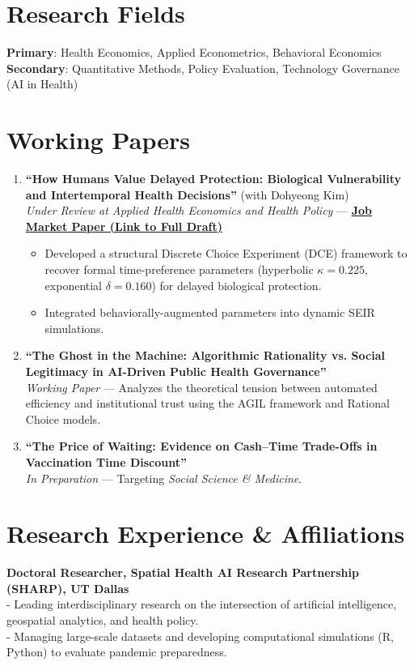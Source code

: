 \documentclass[11pt]{article}
\begin{document}
\section*{Research Fields}
\textbf{Primary}: Health Economics, Applied Econometrics, Behavioral Economics \\
\textbf{Secondary}: Quantitative Methods, Policy Evaluation, Technology Governance (AI in Health)

\section*{Working Papers}
\begin{enumerate}
    \item \textbf{``How Humans Value Delayed Protection: Biological Vulnerability and Intertemporal Health Decisions''} (with Dohyeong Kim) \\
    \textit{Under Review at Applied Health Economics and Health Policy} --- \href{https://yichao2022.github.io/jmp.pdf}{\textbf{Job Market Paper (Link to Full Draft)}}
    \begin{itemize}[noitemsep, topsep=0pt]
        \item Developed a structural Discrete Choice Experiment (DCE) framework to recover formal time-preference parameters (hyperbolic $\kappa = 0.225$, exponential $\delta = 0.160$) for delayed biological protection.
        \item Integrated behaviorally-augmented parameters into dynamic SEIR simulations.
    \end{itemize}

    \item \textbf{``The Ghost in the Machine: Algorithmic Rationality vs. Social Legitimacy in AI-Driven Public Health Governance''} \\
    \textit{Working Paper} --- Analyzes the theoretical tension between automated efficiency and institutional trust using the AGIL framework and Rational Choice models.

    \item \textbf{``The Price of Waiting: Evidence on Cash--Time Trade-Offs in Vaccination Time Discount''} \\
    \textit{In Preparation} --- Targeting \textit{Social Science \& Medicine}.
\end{enumerate}

\section*{Research Experience \& Affiliations}
\textbf{Doctoral Researcher, Spatial Health AI Research Partnership (SHARP), UT Dallas} \\
- Leading interdisciplinary research on the intersection of artificial intelligence, geospatial analytics, and health policy. \\
- Managing large-scale datasets and developing computational simulations (R, Python) to evaluate pandemic preparedness.
\end{document}
